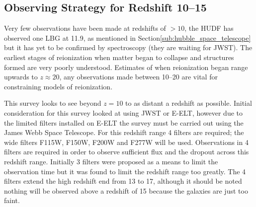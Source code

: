 
\subsection{Observing Strategy for Redshift 10--15} %
\label{sec:observing_strategy_for_redshifts_greater_than_10}
	Very few observations have been made at redshifts of $>10$, the HUDF has observed one LBG at 11.9, as mentioned in Section\ref{sub:hubble_space_telescope} but it has yet to be confirmed by spectroscopy (they are waiting for JWST). The earliest stages of reionization when matter began to collapse and structures formed are very poorly understood. Estimates of when reionization began range upwards to $z\approx20$, any observations made between 10--20 are vital for constraining models of reionization.

	This survey looks to see beyond $z=10$ to as distant a redshift as possible. Initial consideration for this survey looked at using JWST or E-ELT, however due to the limited filters installed on E-ELT the survey must be carried out using the James Webb Space Telescope. For this redshift range 4 filters are required; the wide filters F115W, F150W, F200W and F277W will be used. Observations in 4 filters are required in order to observe sufficient flux and the dropout across this redshift range. Initially 3 filters were proposed as a means to limit the observation time but it was found to limit the redshift range too greatly. The 4 filters extend the high redshift end from 13 to 17, although it should be noted nothing will be observed above a redshift of 15 because the galaxies are just too faint.

